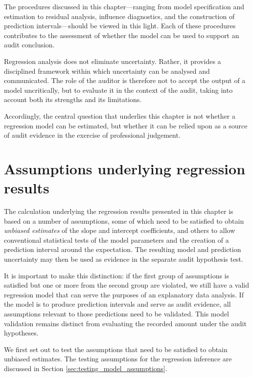 The procedures discussed in this chapter—ranging from model specification and estimation to residual analysis, influence diagnostics, and the construction of prediction intervals—should be viewed in this light. Each of these procedures contributes to the assessment of whether the model can be used to support an audit conclusion.

Regression analysis does not eliminate uncertainty. Rather, it provides a disciplined framework within which uncertainty can be analysed and communicated. The role of the auditor is therefore not to accept the output of a model uncritically, but to evaluate it in the context of the audit, taking into account both its strengths and its limitations.

Accordingly, the central question that underlies this chapter is not whether a regression model can be estimated, but whether it can be relied upon as a source of audit evidence in the exercise of professional judgement.



\section{Assumptions underlying regression results}
\label{sec:assumptions_underlying_regression_results}

The calculation underlying the regression results presented in this chapter is based on a number of assumptions, some of which need to be satisfied to obtain \emph{unbiased estimates} of the slope and intercept coefficients, and others to allow conventional statistical tests of the model parameters and the creation of a prediction interval around the expectation. The resulting model and prediction uncertainty may then be used as evidence in the separate audit hypothesis test.

It is important to make this distinction: if the first group of assumptions is satisfied but one or more from the second group are violated, we still have a valid regression model that can serve the purposes of an explanatory data analysis. If the model is to produce prediction intervals and serve as audit evidence, all assumptions relevant to those predictions need to be validated. This model validation remains distinct from evaluating the recorded amount under the audit hypotheses.

We first set out to test the assumptions that need to be satisfied to obtain unbiased estimates. The testing assumptions for the regression inference are discussed in Section \ref{sec:testing_model_assumptions}.

